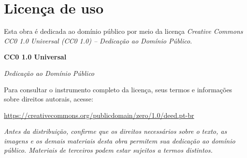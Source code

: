 \chapter*{Licença de uso}
\thispagestyle{plain}

Esta obra é dedicada ao domínio público por meio da licença \textit{Creative Commons CC0 1.0 Universal (CC0 1.0) -- Dedicação ao Domínio Público}.

\begin{center}
\vspace{1em}
\textbf{CC0 1.0 Universal}\par
\textit{Dedicação ao Domínio Público}
\end{center}

Para consultar o instrumento completo da licença, seus termos e informações sobre direitos autorais, acesse:

\begin{center}
\url{https://creativecommons.org/publicdomain/zero/1.0/deed.pt-br}
\end{center}

\medskip
\noindent\textit{Antes da distribuição, confirme que os direitos necessários sobre o texto, as imagens e os demais materiais desta obra permitem sua dedicação ao domínio público. Materiais de terceiros podem estar sujeitos a termos distintos.}